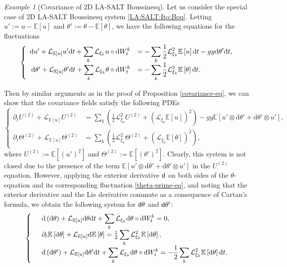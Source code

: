 \documentclass[11pt, oneside]{article}   	%
\numberwithin{equation}{section}
\theoremstyle{plain}
\theoremstyle{definition}
\theoremstyle{remark}
\newtheorem{example}{Example}
\newcommand{\<}{\langle}
\renewcommand{\>}{\rangle}
\def\diff{\textnormal{d}}
\def\rmd{{\mathrm{d}}}
\newcommand{\E}[1]{\mathbb{E}\left[{#1}\right]}
\begin{document}
\begin{example}[Covariance of 2D LA-SALT Boussinesq]\label{2DEB-example}
Let us consider the special case of 2D LA-SALT Boussinesq system \eqref{LA:SALT:Ito:Bou}. Letting $u' := u - \E{u}$ and $\theta' := \theta - \E{\theta}$, we have the following equations for the fluctuations
\begin{equation}\label{theta-prime-eq}
\left\{
\begin{array}{rl}
\diff u' + \mathcal L_{\E{u}} u' \diff t + \displaystyle\sum_{k}\mathcal L_{\xi_k} u \circ \diff W_t^k &= -\displaystyle\sum_{k}\frac12 \mathcal L_{\xi_k}^2 \E{u} \diff t - g y {\rmd} \theta' \diff t, \\
    \diff \theta' + \mathcal L_{\E{u}} \theta' \diff t + \displaystyle\sum_{k}\mathcal L_{\xi_k} \theta \circ \diff W_t^k &= -\displaystyle\sum_{k}\frac12 \mathcal L_{\xi_k}^2 \E{\theta} \diff t. 
\end{array}
\right.
\end{equation}

Then by similar arguments as in the proof of Proposition \ref{covariance-eq}, we can show that the covariance fields satisfy the following PDEs
\begin{equation}\label{theta-var-eq}
\left\{
\begin{array}{rl}
    \partial_{t} U^{(2)}+ \mathcal L_{\E{u}}U^{(2)} &= \displaystyle\sum_k \left(\frac12 \mathcal L_{\xi_k}^2 U^{(2)} + \left(\mathcal L_{\xi_k} \E{u}\right)^2\right) - gy \E{u' \otimes {\rmd} \theta' + {\rmd} \theta' \otimes u'},  \\
    \partial_{t}\Theta^{(2)}+ \mathcal L_{\E{u}}\Theta^{(2)} &= \displaystyle\sum_k \left(\frac12 \mathcal L_{\xi_k}^2\Theta^{(2)} + \left(\mathcal L_{\xi_k} \E{\theta}\right)^2\right),
\end{array}
\right.
\end{equation}
where $U^{(2)} := \E{(u')^2}$ and $\Theta^{(2)} := \E{(\theta')^2}$. Clearly, this system is not closed due to the presence of the term $\E{u' \otimes {\rmd} \theta' + {\rmd} \theta' \otimes u'}$ in the $U^{(2)}$ equation. However, applying the exterior derivative $\sf d$ on both sides of the $\theta$-equation and its corresponding fluctuation \eqref{theta-prime-eq}, and noting that the exterior derivative and the Lie derivative commute as a consequence of Cartan's formula, we obtain the following system for $\sf{d}\theta$ and $\sf{d}\theta'$:
\begin{equation}
    \left\{
    \begin{array}{rl}
&\diff \,({\rmd} \theta) + \mathcal L_{\E{u}} {\rmd} \theta \diff t + \displaystyle\sum_k\mathcal L_{\xi_k} {\rmd} \theta \circ \diff W_t^k = 0, \\
&\partial_{t}\E{{\rmd} \theta} + \mathcal L_{\E{u}} {\rmd} \E{ \theta} = \frac12 \displaystyle\sum_k \mathcal L_{\xi_k}^2 \E{{\rmd}\theta},\\
&\diff\, ({\rmd} \theta') + \mathcal L_{\E{u}} {\rmd} \theta' \diff t + \displaystyle\sum_k\mathcal L_{\xi_k} {\rmd} \theta \circ \diff W_t^k = -\frac12\displaystyle\sum_k \mathcal L_{\xi_k}^2 \E{{\rmd}\theta} \diff t.
\end{array}
\right.
\end{equation}


\end{example}
\end{document}
